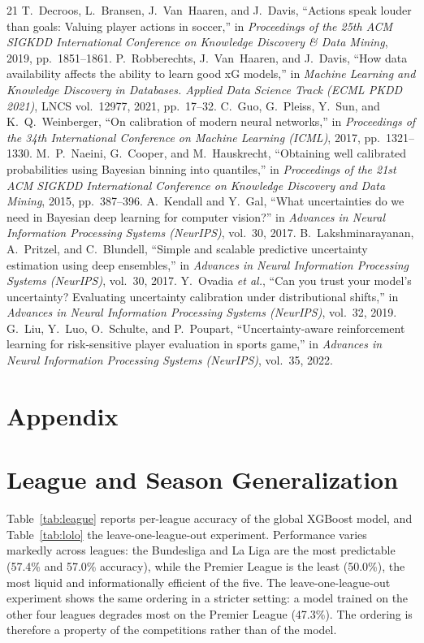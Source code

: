 \documentclass[10pt]{article}
\begin{document}
\begin{thebibliography}{21}
 T.~Decroos, L.~Bransen, J.~Van~Haaren, and J.~Davis,
``Actions speak louder than goals: Valuing player actions in soccer,'' in
\emph{Proceedings of the 25th ACM SIGKDD International Conference on Knowledge
Discovery \& Data Mining}, 2019, pp.~1851--1861.
 P.~Robberechts, J.~Van~Haaren, and J.~Davis, ``How
data availability affects the ability to learn good xG models,'' in
\emph{Machine Learning and Knowledge Discovery in Databases. Applied Data
Science Track (ECML PKDD 2021)}, LNCS vol.~12977, 2021, pp.~17--32.
 C.~Guo, G.~Pleiss, Y.~Sun, and K.~Q.~Weinberger, ``On
calibration of modern neural networks,'' in \emph{Proceedings of the 34th
International Conference on Machine Learning (ICML)}, 2017, pp.~1321--1330.
 M.~P.~Naeini, G.~Cooper, and M.~Hauskrecht, ``Obtaining
well calibrated probabilities using Bayesian binning into quantiles,'' in
\emph{Proceedings of the 21st ACM SIGKDD International Conference on Knowledge
Discovery and Data Mining}, 2015, pp.~387--396.
 A.~Kendall and Y.~Gal, ``What uncertainties do we need in
Bayesian deep learning for computer vision?'' in \emph{Advances in Neural
Information Processing Systems (NeurIPS)}, vol.~30, 2017.
 B.~Lakshminarayanan, A.~Pritzel, and
C.~Blundell, ``Simple and scalable predictive uncertainty estimation using deep
ensembles,'' in \emph{Advances in Neural Information Processing Systems
(NeurIPS)}, vol.~30, 2017.
 Y.~Ovadia \emph{et al.}, ``Can you trust your model's
uncertainty? Evaluating uncertainty calibration under distributional shifts,''
in \emph{Advances in Neural Information Processing Systems (NeurIPS)},
vol.~32, 2019.
 G.~Liu, Y.~Luo, O.~Schulte, and P.~Poupart,
``Uncertainty-aware reinforcement learning for risk-sensitive player
evaluation in sports game,'' in \emph{Advances in Neural Information Processing
Systems (NeurIPS)}, vol.~35, 2022.
\end{thebibliography}

\appendix
\section*{Appendix}

\section{League and Season Generalization}
\label{app:league}
Table~\ref{tab:league} reports per-league accuracy of the global XGBoost model,
and Table~\ref{tab:lolo} the leave-one-league-out experiment. Performance varies markedly across leagues:
the Bundesliga and La Liga are the most predictable (57.4\% and 57.0\%
accuracy), while the Premier League is the least (50.0\%), the most liquid and
informationally efficient of the five. The leave-one-league-out experiment
shows the same ordering in a stricter setting: a model trained on the other
four leagues degrades most on the Premier League (47.3\%). The ordering is
therefore a property of the competitions rather than of the model.
\end{document}

